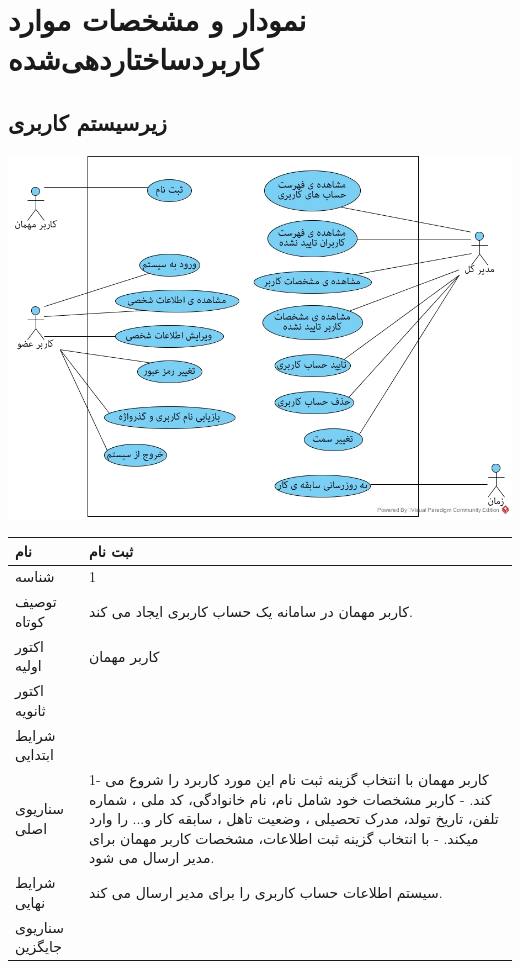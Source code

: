 \newpage
\section{نمودار و مشخصات موارد کاربردساختاردهی‌شده}

\subsection{زیرسیستم کاربری}

\vspace{2cm}
\begin{center}
\includegraphics[width=\textwidth]{Diagrams/Accounting.jpg}
\end{center}

\newpage


\begin{tabular}{|p{2cm}|p{10cm}|}
\hline
نام
&
ثبت نام
\\
\hline
شناسه
&
1
\\
\hline
توصیف کوتاه
&
کاربر مهمان در سامانه یک حساب کاربری ایجاد می کند.
\\
\hline
اکتور اولیه
&
کاربر مهمان
\\
\hline
اکتور ثانویه
&

\\
\hline
شرایط ابتدایی
&

\\
\hline
سناریوی اصلی
&
1-	کاربر مهمان با انتخاب گزینه ثبت نام این مورد کاربرد را شروع می کند.
\newline
2-	کاربر مشخصات خود شامل نام، نام خانوادگی، کد ملی ، شماره تلفن، تاریخ تولد، مدرک تحصیلی ، وضعیت تاهل ، سابقه کار و... را وارد میکند.
\newline
3-	با انتخاب گزینه ثبت اطلاعات، مشخصات کاربر مهمان برای مدیر ارسال می شود.
\\
\hline
شرایط نهایی
&
سیستم اطلاعات حساب کاربری را برای مدیر ارسال می کند.
\\
\hline
سناریوی جایگزین
&

\\
\hline
\end{tabular}

